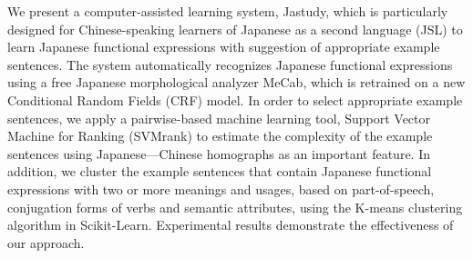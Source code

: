 We present a computer-assisted learning system, Jastudy, which is particularly designed for Chinese-speaking learners of Japanese as a second language (JSL) to learn Japanese functional expressions with suggestion of appropriate example sentences. The system automatically recognizes Japanese functional expressions using a free Japanese morphological analyzer MeCab, which is retrained on a new Conditional Random Fields (CRF) model. In order to select appropriate example sentences, we apply a pairwise-based machine learning tool, Support Vector Machine for Ranking (SVMrank) to estimate the complexity of the example sentences using Japanese---Chinese homographs as an important feature. In addition, we cluster the example sentences that contain Japanese functional expressions with two or more meanings and usages, based on part-of-speech, conjugation forms of verbs and semantic attributes, using the K-means clustering algorithm in Scikit-Learn. Experimental results demonstrate the effectiveness of our approach.
